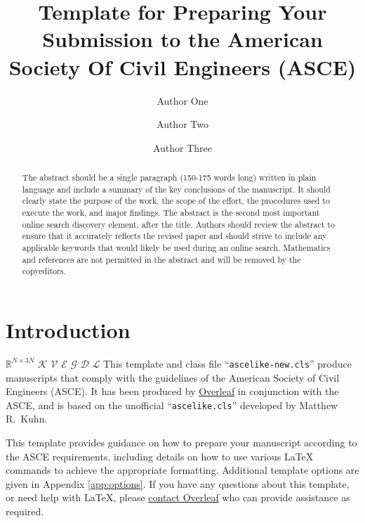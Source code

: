 \documentclass[Journal,letterpaper]{ascelike-new}
\begin{document}
\title{Template for Preparing Your Submission to the American Society Of Civil Engineers (ASCE)}

\author[1]{Author One}
\author[2]{Author Two}
\author[3]{Author Three}


\maketitle

\begin{abstract}
      The abstract should be a single paragraph (150-175 words long) written in plain language and include a summary of the key conclusions of the manuscript. It should clearly state the purpose of the work, the scope of the effort, the procedures used to execute the work, and major findings. The abstract is the second most important online search discovery element, after the title. Authors should review the abstract to ensure that it accurately reflects the revised paper and should strive to include any applicable keywords that would likely be used during an online search. Mathematics and references are not permitted in the abstract and will be removed by the copyeditors.
\end{abstract}

\section{Introduction}
${\mathbb{R}^{N \times 3N}}$
$\mathcal{K}$
$\mathcal{V}$
$\mathcal{E}$
$\mathcal{G}$
$\mathcal{D}$
$\mathcal{L}$
This template and class file ``\texttt{ascelike-new.cls}'' produce manuscripts that comply with the guidelines of the American Society of Civil Engineers (ASCE). It has been produced by \href{https://www.overleaf.com}{Overleaf} in conjunction with the ASCE, and is based on the unofficial ``\texttt{ascelike.cls}'' developed by Matthew R.~Kuhn.

This template provides guidance on how to prepare your manuscript according to the ASCE requirements, including details on how to use various LaTeX commands to achieve the appropriate formatting. Additional template options are given in Appendix \ref{app:options}. If you have any questions about this template, or need help with LaTeX, please \href{https://www.overleaf.com/contact}{contact Overleaf} who can provide assistance as required.
\end{document}
